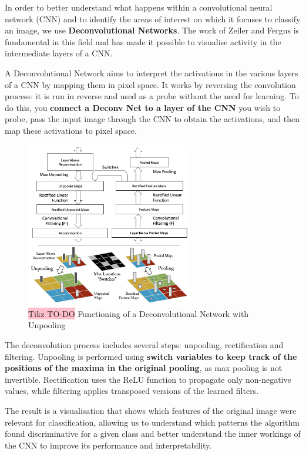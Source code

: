 In order to better understand what happens within a convolutional neural network (CNN) and to identify the areas of interest on which it focuses to classify an image, we use \textbf{Deconvolutional Networks}. The work of Zeiler and Fergus is fundamental in this field and has made it possible to visualise activity in the intermediate layers of a CNN.

A Deconvolutional Network aims to interpret the activations in the various layers of a CNN by mapping them in pixel space. It works by reversing the convolution process: it is run in reverse and used as a probe without the need for learning. To do this, you \textbf{connect a Deconv Net to a layer of the CNN} you wish to probe, pass the input image through the CNN to obtain the activations, and then map these activations to pixel space.

\begin{figure}[!htbp]
    \centering
    \includegraphics[width=0.65\textwidth]{tikz/chapter5 - Deconvolutional Networks.png}
    \caption{{\color{red}\colorbox{pink}{Tikz TO-DO}} Functioning of a Deconvolutional Network with Unpooling}
\end{figure}

The deconvolution process includes several steps: unpooling, rectification and filtering. Unpooling is performed using \textbf{switch variables to keep track of the positions of the maxima in the original pooling}, as max pooling is not invertible. Rectification uses the ReLU function to propagate only non-negative values, while filtering applies transposed versions of the learned filters.

The result is a visualisation that shows which features of the original image were relevant for classification, allowing us to understand which patterns the algorithm found discriminative for a given class and better understand the inner workings of the CNN to improve its performance and interpretability.

